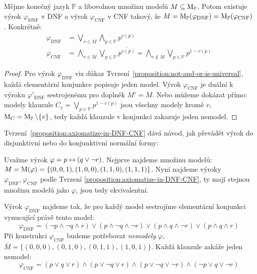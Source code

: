 \begin{proposition} \label{proposition:axiomatize-in-DNF-CNF}
    Mějme konečný jazyk $\mathbb P$ a libovolnou množinu modelů $M\subseteq\operatorname{M}_\mathbb P$. Potom existuje výrok $\varphi_{\mathrm{DNF}}$ v DNF a výrok $\varphi_{\mathrm{CNF}}$ v CNF takový, že $M=\operatorname{M}_\mathbb P(\varphi_{\mathrm{DNF}})=\operatorname{M}_\mathbb P(\varphi_{\mathrm{CNF}})$. Konkrétně:
\begin{align*}
    \varphi_{\mathrm{\mathrm{DNF}}} &= \bigvee_{v\in M}\bigwedge_{p\in\mathbb P}p^{v(p)}\\
    \varphi_{\mathrm{CNF}} &= \bigwedge_{v\in \overline{M}}\bigvee_{p\in\mathbb P}\overline{p^{v(p)}}=\bigwedge_{v\notin M}\bigvee_{p\in\mathbb P}p^{1-v(p)}
\end{align*}
\end{proposition}


\begin{proof}
    Pro výrok $\varphi_{\mathrm{DNF}}$ viz důkaz Tvrzení~\ref{proposition:not-and-or-is-universal}, každá elementární konjunkce popisuje jeden model. Výrok $\varphi_{\mathrm{CNF}}$ je duální k výroku $\varphi'_{\mathrm{DNF}}$ sestrojenému pro doplněk $M'=\overline{M}$. Nebo můžeme dokázat přímo: modely klauzule $C_v=\bigvee_{p\in\mathbb P}p^{1-v(p)}$ jsou všechny modely kromě $v$, $\operatorname{M}_C=\operatorname{M}_\mathbb P\setminus\{v\}$, tedy každá klauzule v konjunkci zakazuje jeden nemodel.
\end{proof}

Tvrzení~\ref{proposition:axiomatize-in-DNF-CNF} dává návod, jak převádět výrok do disjunktivní nebo do konjunktivní normální formy:

\begin{example}
    Uvažme výrok $\varphi=p\mathbin{\leftrightarrow} (q\lor \neg r)$. Nejprve najdeme množinu modelů: $M=\operatorname{M}(\varphi)=\{(0,0,1),(1,0,0),(1,1,0),(1,1,1)\}$. Nyní najdeme výroky $\varphi_{\mathrm{DNF}},\varphi_{\mathrm{CNF}}$ podle Tvrzení \ref{proposition:axiomatize-in-DNF-CNF}, ty mají stejnou množinu modelů jako $\varphi$, jsou tedy ekvivalentní.

    Výrok $\varphi_{\mathrm{DNF}}$ najdeme tak, že pro každý model sestrojíme elementární konjunkci vynucující právě tento model:
    $$
    \varphi_{\mathrm{DNF}}=(\neg p\land\neg q\land r)\lor (p\land\neg q\land\neg r) \lor (p\land q\land\neg r)\lor (p\land q\land r)
    $$
    Při konstrukci $\varphi_{\mathrm{CNF}}$ budeme potřebovat \emph{nemodely} $\varphi$, $\overline{M}=\{(0,0,0),(0,1,0),(0,1,1),(1,0,1)\}$. Každá klauzule zakáže jeden nemodel:
    $$
    \varphi_{\mathrm{CNF}}=(p\lor q\lor r)\land (p\lor\neg q\lor r) \land (p\lor \neg q\lor\neg r)\land (\neg p\lor q\lor\neg r)
    $$   
\end{example}

